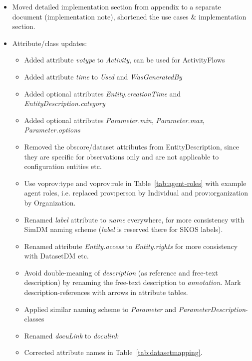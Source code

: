 \documentclass[11pt,a4paper]{ivoa}
\newcommand{\class}[1]{\emph{#1}}
\begin{document}
\begin{appendices}
\begin{itemize}
\item Moved detailed implementation section from appendix to a separate document (implementation note), shortened the use cases \& implementation section.
\item Attribute/class updates:
\begin{itemize}
    \item Added attribute \emph{votype} to \class{Activity}, can be used for ActivityFlows
    \item Added attribute \emph{time} to \class{Used} and \class{WasGeneratedBy}
    \item Added optional attributes \emph{Entity.creationTime} and \emph{EntityDescription.category}
    \item Added optional attributes \emph{Parameter.min},  \emph{Parameter.max},  \emph{Parameter.options}
    \item Removed the obscore/dataset attributes from EntityDescription, since they are specific for observations only and are not applicable to configuration entities etc.
    \item Use voprov:type and voprov:role in Table~\ref{tab:agent-roles} with example agent roles, i.e. replaced prov:person by Individual and prov:organization by Organization.
    \item Renamed \emph{label} attribute to \emph{name} everywhere, for more consistency with SimDM naming scheme (\emph{label} is reserved there for SKOS labels).
    \item Renamed attribute \emph{Entity.access} to \emph{Entity.rights} for more consistency with DatasetDM etc.
    \item Avoid double-meaning of \emph{description} (as reference and free-text description) by renaming the free-text description to \emph{annotation}. Mark description-references with arrows in attribute tables.
    \item Applied similar naming scheme to \emph{Parameter} and \emph{ParameterDescription}-classes
    \item Renamed \emph{docuLink} to \emph{doculink}
    \item Corrected attribute names in Table~\ref{tab:datasetmapping}.
\end{itemize}


\end{itemize}

\end{appendices}

\listoffigures
 
\listoftables


\end{document}
